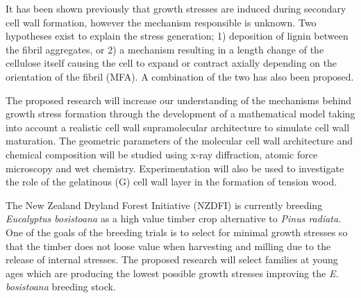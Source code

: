 It has been shown previously that growth stresses are induced during secondary
cell wall formation, however the mechanism responsible is unknown. Two
hypotheses exist to explain the stress generation; 1) deposition of lignin
between the fibril aggregates, or 2) a mechanism resulting in
a length change of the cellulose itself causing the cell to expand or contract axially
depending on the orientation of the fibril (MFA). A combination of the two has also been proposed.

The proposed research will increase our understanding of the mechanisms behind
growth stress formation through the development of a mathematical model taking
into account a realistic cell wall supramolecular architecture to simulate cell wall 
maturation. The geometric parameters of the molecular cell wall architecture and
chemical composition will be studied using x-ray diffraction, atomic force
microscopy and wet chemistry. Experimentation will also be used to
investigate the role of the gelatinous (G) cell wall layer in the formation of tension wood.

The New Zealand Dryland Forest Initiative (NZDFI) is currently breeding
\textit{Eucalyptus bosistoana} as a high value timber crop alternative to
\textit{Pinus radiata}. One of the goals of the breeding trials is to select for
minimal growth stresses so that the timber does not loose value when harvesting
and milling due to the release of internal stresses. The proposed research will
select families at young ages which are producing the lowest possible growth
stresses improving the \textit{E. bosistoana} breeding stock.